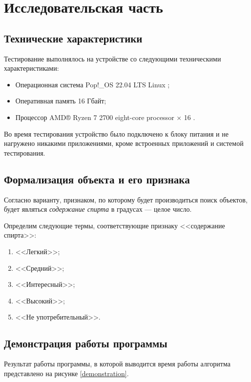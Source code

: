 \chapter{Исследовательская часть}
\section{Технические характеристики}
Тестирование выполнялось на устройстве со следующими техническими характеристиками:
\begin{itemize}
	\item Операционная система Pop!\_OS 22.04 LTS \cite{ubuntu} Linux \cite{linux};
	\item Оперативная память 16 Гбайт;
	\item Процессор AMD® Ryzen 7 2700 eight-core processor × 16 \cite{amd}.
\end{itemize}

Во время тестирования устройство было подключено к блоку питания и не нагружено никакими приложениями, кроме встроенных приложений и системой тестирования.

\section{Формализация объекта и его признака}
\label{formal}

Согласно варианту, признаком, по которому будет производиться поиск объектов, будет являться \textit{содержание спирта} в градусах --- целое число.

Определим следующие термы, соответствующие признаку <<содержание спирта>>:
\begin{enumerate}[label=\arabic*)]
	\item <<Легкий>>;
	\item <<Средний>>;
	\item <<Интересный>>;
	\item <<Высокий>>;
	\item <<Не употребительный>>.
\end{enumerate}


\section{Демонстрация работы программы}


Результат работы программы, в которой выводится время работы алгоритма представлено на рисунке \ref{demonstration}.

